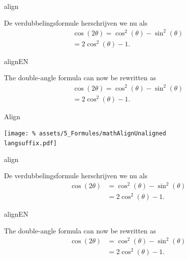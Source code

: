 \documentclass[presentatie.tex]{subfiles}
\begin{document}

\begin{saveblock}{align}
	\begin{highlightblock}[gobble=8,linewidth=\textwidth,
		framexleftmargin=0.25em,xleftmargin=0.25em]
		De verdubbelingsformule herschrijven we nu als
		\begin{align}
			\cos(2\theta) = \cos^2(\theta) - \sin^2(\theta)\\
			= 2\cos^2(\theta)-1.
		\end{align}
	\end{highlightblock}
\end{saveblock}

\begin{saveblock}{alignEN}
	\begin{highlightblock}[gobble=8,linewidth=\textwidth,
		framexleftmargin=0.25em,xleftmargin=0.25em]
		The double-angle formula can now be rewritten as
		\begin{align}
			\cos(2\theta) = \cos^2(\theta) - \sin^2(\theta)\\
			= 2\cos^2(\theta)-1.
		\end{align}
	\end{highlightblock}
\end{saveblock}


\begin{frame}{Align}

	\texttt{[image: \%
		assets/5\_Formules/mathAlignUnaligned\\langsuffix.pdf]}
\end{frame}

\begin{saveblock}{align}
	\begin{highlightblock}[gobble=8,linewidth=\textwidth,
		framexleftmargin=0.25em,xleftmargin=0.25em]
		De verdubbelingsformule herschrijven we nu als
		\begin{align}
			\cos(2\theta) &= \cos^2(\theta) - \sin^2(\theta)\\
			&= 2\cos^2(\theta)-1.
		\end{align}
	\end{highlightblock}
\end{saveblock}

\begin{saveblock}{alignEN}
	\begin{highlightblock}[gobble=8,linewidth=\textwidth,
		framexleftmargin=0.25em,xleftmargin=0.25em]
		The double-angle formula can now be rewritten as
		\begin{align}
			\cos(2\theta) &= \cos^2(\theta) - \sin^2(\theta)\\
			&= 2\cos^2(\theta)-1.
		\end{align}
	\end{highlightblock}
\end{saveblock}
\end{document}
